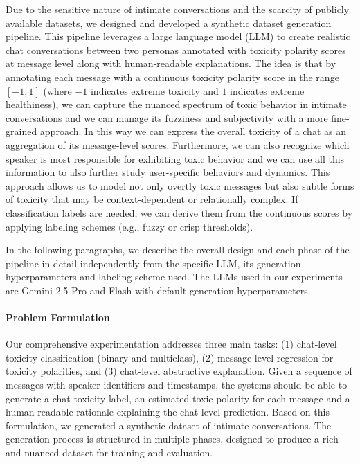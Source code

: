 \documentclass[twocolumn]{ceurart}
\begin{document}
Due to the sensitive nature of intimate conversations and the scarcity of publicly available datasets, we designed and developed a synthetic dataset generation pipeline. This pipeline leverages a large language model (LLM) to create realistic chat conversations between two personas annotated with toxicity polarity scores at message level along with human-readable explanations.  The idea is that by annotating each message with a continuous toxicity polarity score in the range $[-1, 1]$ (where $-1$ indicates extreme toxicity and $1$ indicates extreme healthiness), we can capture the nuanced spectrum of toxic behavior in intimate conversations and we can manage its fuzziness and subjectivity with a more fine-grained approach. In this way we can express the overall toxicity of a chat as an aggregation of its message-level scores. Furthermore, we can also recognize which speaker is most responsible for exhibiting toxic behavior and we can use all this information to also further study user-specific behaviors and dynamics. This approach allows us to model not only overtly toxic messages but also subtle forms of toxicity that may be context-dependent or relationally complex. If classification labels are needed, we can derive them from the continuous scores by applying labeling schemes (e.g., fuzzy or crisp thresholds).

In the following paragraphs, we describe the overall design and each phase of the pipeline in detail independently from the specific LLM, its generation hyperparameters and labeling scheme used. The LLMs used in our experiments are Gemini 2.5 Pro and Flash with default generation hyperparameters.

\paragraph{Problem Formulation}

Our comprehensive experimentation addresses three main tasks: (1) chat-level toxicity classification (binary and multiclass), (2) message-level regression for toxicity polarities, and (3) chat-level abstractive explanation. Given a sequence of messages with speaker identifiers and timestamps, the systems should be able to generate a chat toxicity label, an estimated toxic polarity for each message and a human-readable rationale explaining the chat-level prediction. Based on this formulation, we generated a synthetic dataset of intimate conversations. The generation process is structured in multiple phases, designed to produce a rich and nuanced dataset for training and evaluation.
\end{document}
